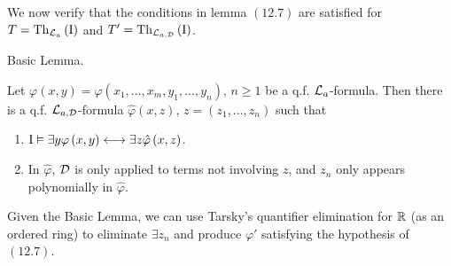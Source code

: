 We now verify that the conditions in lemma $\left(12.7\right)$ are
satisfied for $T=\mathrm{Th}_{\mathcal{L}_{a}}\left(\mathrm{I}\right)$ and $T'=\mathrm{Th}_{\mathcal{L}_{a,\mathcal{D}}}\left(\mathrm{I}\right)$.
\begin{lem*}
\label{12.8} Basic Lemma.

Let $\varphi\left(x,y\right)=\varphi\left(x_{1},...,x_{m},y_{1},...,y_{n}\right)$,
$n\geq1$ be a q.f. $\mathcal{L}_{a}$-formula. Then there is a q.f. $\mathcal{L}_{a,\mathcal{D}}$-formula
$\hat{\varphi}\left(x,z\right)$, $z=\left(z_{1},...,z_{n}\right)$
such that
\begin{enumerate}
\item $\mathrm{I}\vDash\exists y\varphi\left(x,y\right)\longleftrightarrow\exists z\hat{\varphi}\left(x,z\right)$.
\item In $\hat{\varphi}$, $\mathcal{D}$ is only applied to terms not involving
$z$, and $z_{n}$ only appears polynomially in $\hat{\varphi}$.
\end{enumerate}
\end{lem*}
Given the Basic Lemma, we can use Tarsky's quantifier elimination
for $\mathbb{R}$ (as an ordered ring) to eliminate $\exists z_{n}$ and produce
$\varphi'$ satisfying the hypothesis of $\left(12.7\right)$.

